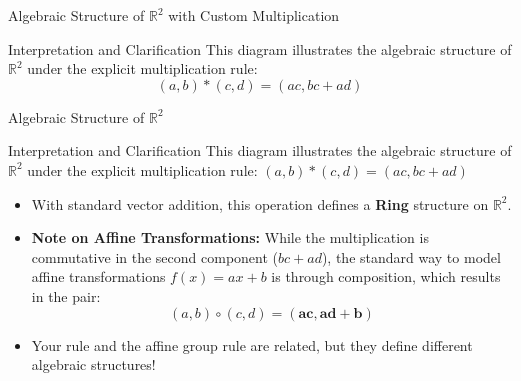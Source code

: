 \begin{frame}{Algebraic Structure of $\mathbb{R}^2$ with Custom Multiplication}
\vspace{-0.3cm}
\begin{center}
\end{center}
\begin{block}{Interpretation and Clarification}
This diagram illustrates the algebraic structure of $\mathbb{R}^2$ under the explicit multiplication rule:
$$(a, b) * (c, d) = (ac, bc + ad)$$
\end{block}
\end{frame}

\begin{frame}{Algebraic Structure of $\mathbb{R}^2$}
\vspace{-0.3cm}
\begin{block}{Interpretation and Clarification}
This diagram illustrates the algebraic structure of $\mathbb{R}^2$ under the explicit multiplication rule:
$(a, b) * (c, d) = (ac, bc + ad)$
\begin{itemize}
    \item With standard vector addition, this operation defines a \textbf{Ring} structure on $\mathbb{R}^2$.
    \item \textbf{Note on Affine Transformations:} While the multiplication is commutative in the second component ($bc+ad$), the standard way to model affine transformations $f(x) = ax+b$ is through composition, which results in the pair:
    $$(a,b) \circ (c,d) = (\mathbf{ac}, \mathbf{ad+b})$$
    \item Your rule and the affine group rule are related, but they define different algebraic structures!
\end{itemize}
\end{block}
\end{frame}

